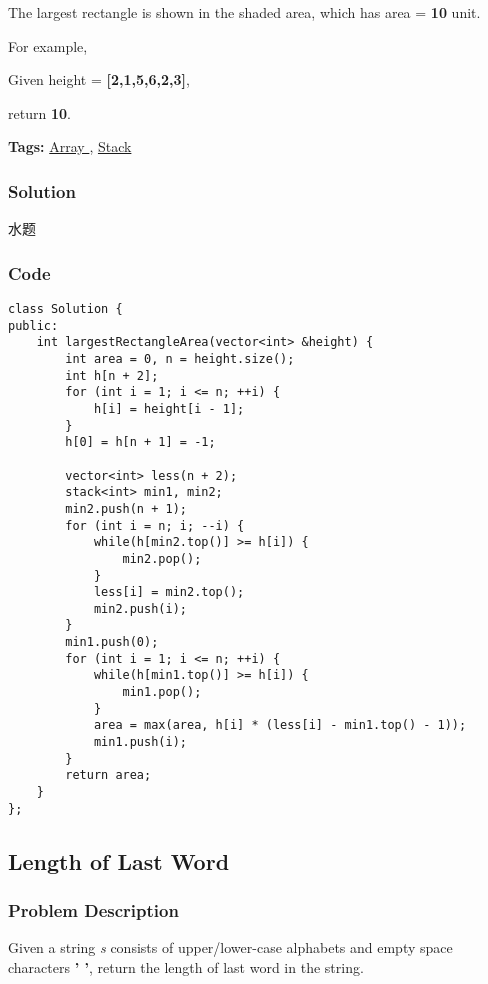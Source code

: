 \documentclass{article}
\begin{document}
\begin{CJK*}{UTF8}{gkai}
The largest rectangle is shown in the shaded area, which has area = \textbf{10} unit.

For example,


Given height = \textbf{[2,1,5,6,2,3]},


return \textbf{10}.


\textbf{Tags: }
\hyperref[ Array ]{ Array },  \hyperref[ Stack ]{ Stack }



\subsubsection*{Solution}
水题

\subsubsection*{Code}
\begin{lstlisting}
class Solution {
public:
    int largestRectangleArea(vector<int> &height) {
        int area = 0, n = height.size();
        int h[n + 2];
        for (int i = 1; i <= n; ++i) {
            h[i] = height[i - 1];
        }
        h[0] = h[n + 1] = -1;
        
        vector<int> less(n + 2);
        stack<int> min1, min2;
        min2.push(n + 1);
        for (int i = n; i; --i) {
            while(h[min2.top()] >= h[i]) {
                min2.pop();
            }
            less[i] = min2.top();
            min2.push(i);
        }
        min1.push(0);
        for (int i = 1; i <= n; ++i) {
            while(h[min1.top()] >= h[i]) {
                min1.pop();
            }
            area = max(area, h[i] * (less[i] - min1.top() - 1));
            min1.push(i);
        }
        return area;
    }
}; 
\end{lstlisting}


\subsection{ Length of Last Word }
\label{ Length of Last Word }

\subsubsection*{Problem Description}
Given a string \emph{s} consists of upper/lower-case alphabets and empty space characters \textbf{' '}, return the length of last word in the string.


\end{CJK*}
\end{document}
